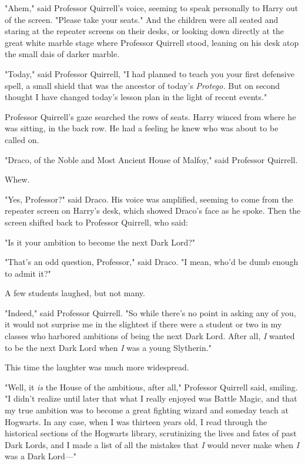 "Ahem," said Professor Quirrell's voice, seeming to speak personally to Harry out of the screen. "Please take your seats."
\sbreak
And the children were all seated and staring at the repeater screens on their desks, or looking down directly at the great white marble stage where Professor Quirrell stood, leaning on his desk atop the small dais of darker marble.

"Today," said Professor Quirrell, "I had planned to teach you your first defensive spell, a small shield that was the ancestor of today's \emph{Protego.} But on second thought I have changed today's lesson plan in the light of recent events."

Professor Quirrell's gaze searched the rows of seats. Harry winced from where he was sitting, in the back row. He had a feeling he knew who was about to be called on.

"Draco, of the Noble and Most Ancient House of Malfoy," said Professor Quirrell.

Whew.

"Yes, Professor?" said Draco. His voice was amplified, seeming to come from the repeater screen on Harry's desk, which showed Draco's face as he spoke. Then the screen shifted back to Professor Quirrell, who said:

"Is it your ambition to become the next Dark Lord?"

"That's an odd question, Professor," said Draco. "I mean, who'd be dumb enough to admit it?"

A few students laughed, but not many.

"Indeed," said Professor Quirrell. "So while there's no point in asking any of you, it would not surprise me in the slightest if there were a student or two in my classes who harbored ambitions of being the next Dark Lord. After all, \emph{I} wanted to be the next Dark Lord when \emph{I} was a young Slytherin."

This time the laughter was much more widespread.

"Well, it \emph{is} the House of the ambitious, after all," Professor Quirrell said, smiling. "I didn't realize until later that what I really enjoyed was Battle Magic, and that my true ambition was to become a great fighting wizard and someday teach at Hogwarts. In any case, when I was thirteen years old, I read through the historical sections of the Hogwarts library, scrutinizing the lives and fates of past Dark Lords, and I made a list of all the mistakes that \emph{I} would never make when \emph{I} was a Dark Lord---"

